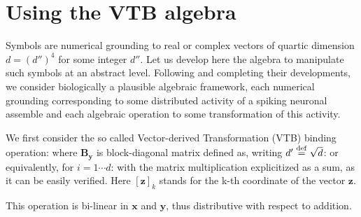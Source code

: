 \section{Using the VTB algebra} \label{VTB-algebra}

Symbols are numerical grounding to real or complex vectors of quartic dimension $d = (d'')^4$ for some integer $d''$. Let us develop here the algebra to manipulate such symbols at an abstract level. Following \cite{gosmann_vector-derived_2019} and completing their developments, we consider biologically a plausible algebraic framework, each numerical grounding corresponding to some distributed  activity of a spiking neuronal assemble and each algebraic operation to some transformation of this activity.


We first consider the so called Vector-derived Transformation (VTB) binding operation:
where $\mathbf{B_y}$ is block-diagonal matrix defined as, writing $d' \stackrel {\rm def}{=} \sqrt{d}$:
or equivalently, for $i = 1 \cdots d$:
with the matrix multiplication explicitized as a sum, as it can be easily verified. Here $[\mathbf{z}]_k$ stands for the k-th coordinate of the vector $\mathbf{z}$.

This operation is bi-linear in $\mathbf{x}$ and $\mathbf{y}$, thus distributive with respect to addition.

